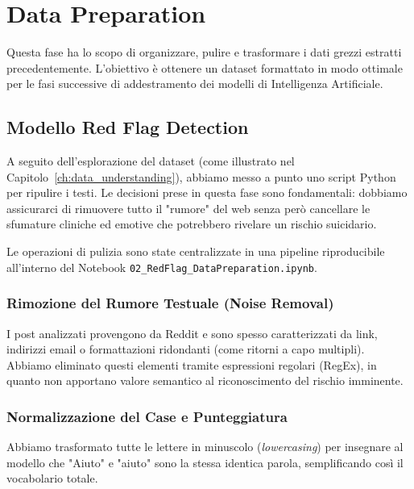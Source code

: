 \chapter{Data Preparation}
\label{ch:data_preparation}

Questa fase ha lo scopo di organizzare, pulire e trasformare i dati grezzi estratti precedentemente. L'obiettivo è ottenere un dataset formattato in modo ottimale per le fasi successive di addestramento dei modelli di Intelligenza Artificiale.

\section{Modello Red Flag Detection}
\label{sec:prep_red_flag}

A seguito dell'esplorazione del dataset (come illustrato nel Capitolo~\ref{ch:data_understanding}), abbiamo messo a punto uno script Python per ripulire i testi. Le decisioni prese in questa fase sono fondamentali: dobbiamo assicurarci di rimuovere tutto il "rumore" del web senza però cancellare le sfumature cliniche ed emotive che potrebbero rivelare un rischio suicidario.

Le operazioni di pulizia sono state centralizzate in una pipeline riproducibile all'interno del Notebook \texttt{02\_RedFlag\_DataPreparation.ipynb}.

\subsection{Rimozione del Rumore Testuale (Noise Removal)}
I post analizzati provengono da Reddit e sono spesso caratterizzati da link, indirizzi email o formattazioni ridondanti (come ritorni a capo multipli). 
Abbiamo eliminato questi elementi tramite espressioni regolari (RegEx), in quanto non apportano valore semantico al riconoscimento del rischio imminente.


\subsection{Normalizzazione del Case e Punteggiatura}
Abbiamo trasformato tutte le lettere in minuscolo (\textit{lowercasing}) per insegnare al modello che "Aiuto" e "aiuto" sono la stessa identica parola, semplificando così il vocabolario totale.

